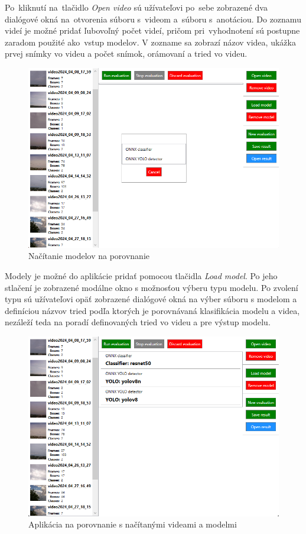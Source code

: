         Po~kliknutí na~tlačidlo \emph{Open video} sú užívateľovi po~sebe zobrazené dva dialógové okná na~otvorenia súboru s~videom a~súboru s~anotáciou. Do zoznamu videí je možné pridať ľubovoľný počet videí, pričom pri~vyhodnotení sú postupne zaradom použité ako~vstup modelov. V zozname sa zobrazí názov videa, ukážka prvej snímky vo videu a počet snímok, orámovaní a tried vo videu.

        \begin{figure}[H]
            \centering
            \includegraphics[width=.8\textwidth]{obrazky/evaluator/load model.png}
            \caption{Načítanie modelov na porovnanie}
        \end{figure}

        Modely je možné do aplikácie pridať pomocou tlačidla \emph{Load model}. Po jeho stlačení je zobrazené modálne okno s možnosťou výberu typu modelu. Po zvolení typu sú užívateľovi opäť zobrazené dialógové okná na výber súboru s modelom a definíciou názvov tried podľa ktorých je porovnávaná klasifikácia modelu a videa, nezáleží teda na poradí definovaných tried vo videu a pre výstup modelu.

        \begin{figure}[H]
            \centering
            \includegraphics[width=.8\textwidth]{obrazky/evaluator/open everything.png}
            \caption{Aplikácia na porovnanie s načítanými videami a modelmi}
        \end{figure}

